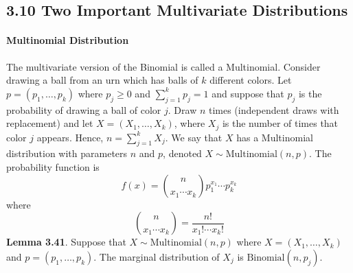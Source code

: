 \subsection*{3.10 Two Important Multivariate Distributions}\label{two-important-multivariate-distributions}
\paragraph{Multinomial Distribution}\label{multinomial-distribution}
The multivariate version of the Binomial is called a Multinomial.
Consider drawing a ball from an urn which has balls of \(k\) different
colors. Let \(p = (p_{1}, \dots, p_{k})\) where \(p_{j} \geq 0\) and
\(\sum_{j=1}^{k} p_{j} = 1\) and suppose that \(p_{j}\) is the probability of
drawing a ball of color \(j\). Draw \(n\) times (independent draws with
replacement) and let \(X = (X_{1}, \dots, X_{k})\), where \(X_{j}\) is the
number of times that color \(j\) appears. Hence,
\(n = \sum_{j=1}^{k} X_{j}\). We say that \(X\) has a Multinomial
distribution with parameters \(n\) and \(p\), denoted
\(X \sim \text{Multinomial}(n, p)\). The probability function is
\[
f(x) = \binom{n}{x_{1} \cdots x_{k}} p_{1}^{x_{1}} \cdots p_{k}^{x_{k}}
\]
where
\[
\binom{n}{x_{1} \cdots x_{k}} = \frac{n!}{x_{1}! \cdots x_{k}!}
\]
\textbf{Lemma 3.41}. Suppose that \(X \sim \text{Multinomial}(n, p)\)
where \(X = (X_{1}, \dots, X_{k})\) and \(p = (p_{1}, \dots, p_{k})\). The
marginal distribution of \(X_{j}\) is \(\text{Binomial}(n, p_{j})\).
